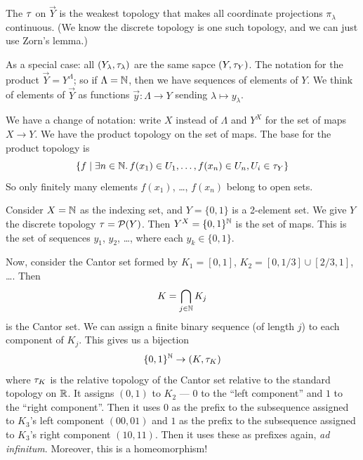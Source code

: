 \begin{definition}
The  $\tau$ on $\vec{Y}$ is the weakest
topology that makes all coordinate projections $\pi_{\lambda}$
continuous. (We know the discrete topology is one such topology, and
we can just use Zorn's lemma.)
\end{definition}

\begin{node}
As a special case: all $(Y_{\lambda},\tau_{\lambda})$ are the same
sapce $(Y,\tau_{Y})$. The notation for the product
$\vec{Y}=Y^{\Lambda}$; so if $\Lambda=\mathbb{N}$, then we have sequences of
elements of $Y$. We think of elements of $\vec{Y}$ as functions
$\vec{y}\colon\Lambda\to Y$ sending $\lambda\mapsto y_{\lambda}$.
\end{node}

\begin{node}
We have a change of notation: write $X$ instead of $\Lambda$ and
$Y^{X}$ for the set of maps $X\to Y$. We have the product topology on
the set of maps. The base for the product topology is
\begin{equation*}
\{f\mid \exists n\in\mathbb{N}\ldotp f(x_{1})\in U_{1},\dots,f(x_{n})\in
U_{n}, U_{i}\in\tau_{Y}\}
\end{equation*}
So only finitely many elements $f(x_{1})$, \dots, $f(x_{n})$ belong to
open sets.
\end{node}

\begin{example}
Consider $X=\mathbb{N}$ as the indexing set, and $Y=\{0,1\}$ is a 2-element
set. We give $Y$ the discrete topology $\tau=\mathcal{P}(Y)$. Then
$Y^{X}=\{0,1\}^{\mathbb{N}}$ is the set of maps. This is the set of sequences
$y_{1}$, $y_{2}$, \dots, where each $y_{k}\in\{0,1\}$.

Now, consider the Cantor set formed by $K_{1}=[0,1]$,
$K_{2}=[0,1/3]\cup[2/3,1]$, \dots. Then
\begin{equation}
K=\bigcap_{j\in\mathbb{N}}K_{j}
\end{equation}
is the Cantor set. We can assign a finite binary sequence (of length
$j$) to each component of $K_{j}$. This gives us a bijection
\begin{equation}
\{0,1\}^{\mathbb{N}}\to(K,\tau_{K})
\end{equation}
where $\tau_{K}$ is the relative topology of the Cantor set relative
to the standard topology on $\mathbb{R}$. It assigns $(0,1)$ to $K_{2}$ ---
$0$ to the ``left component'' and $1$ to the ``right component''. Then
it uses $0$ as the prefix to the subsequence assigned to $K_{3}$'s
left component $(00,01)$ and $1$ as the prefix to the subsequence
assigned to $K_{3}$'s right component $(10,11)$. Then it uses these as
prefixes again, \textit{ad infinitum}.
Moreover, this is a homeomorphism!
\end{example}

